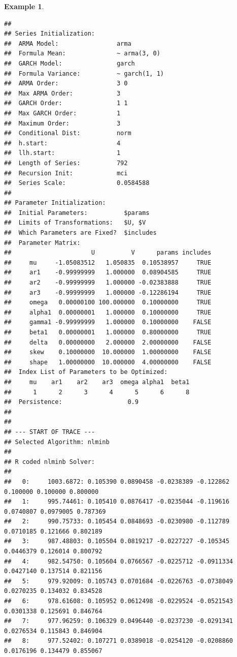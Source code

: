 \documentclass[
]{book}
\theoremstyle{definition}
\theoremstyle{definition}
\newtheorem{example}{Example}[chapter]
\theoremstyle{definition}
\theoremstyle{definition}
\theoremstyle{remark}
\begin{document}
\begin{example}
\begin{verbatim}
## 
## Series Initialization:
##  ARMA Model:                arma
##  Formula Mean:              ~ arma(3, 0)
##  GARCH Model:               garch
##  Formula Variance:          ~ garch(1, 1)
##  ARMA Order:                3 0
##  Max ARMA Order:            3
##  GARCH Order:               1 1
##  Max GARCH Order:           1
##  Maximum Order:             3
##  Conditional Dist:          norm
##  h.start:                   4
##  llh.start:                 1
##  Length of Series:          792
##  Recursion Init:            mci
##  Series Scale:              0.0584588
## 
## Parameter Initialization:
##  Initial Parameters:          $params
##  Limits of Transformations:   $U, $V
##  Which Parameters are Fixed?  $includes
##  Parameter Matrix:
##                      U          V      params includes
##     mu     -1.05083512   1.050835  0.10538957     TRUE
##     ar1    -0.99999999   1.000000  0.08904585     TRUE
##     ar2    -0.99999999   1.000000 -0.02383888     TRUE
##     ar3    -0.99999999   1.000000 -0.12286194     TRUE
##     omega   0.00000100 100.000000  0.10000000     TRUE
##     alpha1  0.00000001   1.000000  0.10000000     TRUE
##     gamma1 -0.99999999   1.000000  0.10000000    FALSE
##     beta1   0.00000001   1.000000  0.80000000     TRUE
##     delta   0.00000000   2.000000  2.00000000    FALSE
##     skew    0.10000000  10.000000  1.00000000    FALSE
##     shape   1.00000000  10.000000  4.00000000    FALSE
##  Index List of Parameters to be Optimized:
##     mu    ar1    ar2    ar3  omega alpha1  beta1 
##      1      2      3      4      5      6      8 
##  Persistence:                  0.9 
## 
## 
## --- START OF TRACE ---
## Selected Algorithm: nlminb 
## 
## R coded nlminb Solver: 
## 
##   0:     1003.6872: 0.105390 0.0890458 -0.0238389 -0.122862 0.100000 0.100000 0.800000
##   1:     995.74461: 0.105410 0.0876417 -0.0235044 -0.119616 0.0740807 0.0979005 0.787369
##   2:     990.75733: 0.105454 0.0848693 -0.0230980 -0.112789 0.0710185 0.121666 0.802189
##   3:     987.48803: 0.105504 0.0819217 -0.0227227 -0.105345 0.0446379 0.126014 0.800792
##   4:     982.54750: 0.105604 0.0766567 -0.0225712 -0.0911334 0.0427140 0.137514 0.821156
##   5:     979.92009: 0.105743 0.0701684 -0.0226763 -0.0738049 0.0270235 0.134032 0.834528
##   6:     978.61608: 0.105952 0.0612498 -0.0229524 -0.0521543 0.0301338 0.125691 0.846764
##   7:     977.96259: 0.106329 0.0496440 -0.0237230 -0.0291341 0.0276534 0.115843 0.846904
##   8:     977.52402: 0.107271 0.0389018 -0.0254120 -0.0208860 0.0176196 0.134479 0.855067

\end{verbatim}
\end{example}
\end{document}
